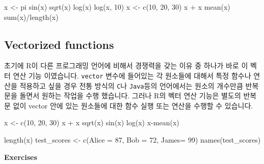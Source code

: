 \documentclass[
]{book}
\newenvironment{Shaded}{\begin{snugshade}}{\end{snugshade}}
\newcommand{\AttributeTok}[1]{\textcolor[rgb]{0.77,0.63,0.00}{#1}}
\newcommand{\DecValTok}[1]{\textcolor[rgb]{0.00,0.00,0.81}{#1}}
\newcommand{\FunctionTok}[1]{\textcolor[rgb]{0.00,0.00,0.00}{#1}}
\newcommand{\NormalTok}[1]{#1}
\newcommand{\OtherTok}[1]{\textcolor[rgb]{0.56,0.35,0.01}{#1}}
\newcommand{\SpecialCharTok}[1]{\textcolor[rgb]{0.00,0.00,0.00}{#1}}
\begin{document}
\begin{Shaded}
\begin{Highlighting}[]
\NormalTok{x }\OtherTok{\textless{}{-}}\NormalTok{ pi}
\FunctionTok{sin}\NormalTok{(x)}
\FunctionTok{sqrt}\NormalTok{(x)}
\FunctionTok{log}\NormalTok{(x)}
\FunctionTok{log}\NormalTok{(x, }\DecValTok{10}\NormalTok{)}
\NormalTok{x }\OtherTok{\textless{}{-}} \FunctionTok{c}\NormalTok{(}\DecValTok{10}\NormalTok{, }\DecValTok{20}\NormalTok{, }\DecValTok{30}\NormalTok{)}
\NormalTok{x }\SpecialCharTok{+}\NormalTok{ x}
\FunctionTok{mean}\NormalTok{(x)}
\FunctionTok{sum}\NormalTok{(x)}\SpecialCharTok{/}\FunctionTok{length}\NormalTok{(x)}
\end{Highlighting}
\end{Shaded}

\hypertarget{vectorized-functions}{%
\subsection{Vectorized functions}\label{vectorized-functions}}

초기에 R이 다른 프로그래밍 언어에 비해서 경쟁력을 갖는 이유 중 하나가 바로 이 벡터 연산 기능 이였습니다. \texttt{vector} 변수에 들어있는 각 원소들에 대해서 특정 함수나 연산을 적용하고 싶을 경우 전통 방식의 \texttt{C}나 \texttt{Java}등의 언어에서는 원소의 개수만큼 반복문을 돌면서 원하는 작업을 수행 했습니다. 그러나 R의 벡터 연산 기능은 별도의 반복문 없이 vector 안에 있는 원소들에 대한 함수 실행 또는 연산을 수행할 수 있습니다.

\begin{Shaded}
\begin{Highlighting}[]
\NormalTok{x }\OtherTok{\textless{}{-}} \FunctionTok{c}\NormalTok{(}\DecValTok{10}\NormalTok{, }\DecValTok{20}\NormalTok{, }\DecValTok{30}\NormalTok{)}
\NormalTok{x }\SpecialCharTok{+}\NormalTok{ x}
\FunctionTok{sqrt}\NormalTok{(x)}
\FunctionTok{sin}\NormalTok{(x)}
\FunctionTok{log}\NormalTok{(x)}
\NormalTok{x}\SpecialCharTok{{-}}\FunctionTok{mean}\NormalTok{(x)}

\FunctionTok{length}\NormalTok{(x)}
\NormalTok{test\_scores }\OtherTok{\textless{}{-}} \FunctionTok{c}\NormalTok{(}\AttributeTok{Alice =} \DecValTok{87}\NormalTok{, }\AttributeTok{Bob =} \DecValTok{72}\NormalTok{, }\AttributeTok{James=} \DecValTok{99}\NormalTok{)}
\FunctionTok{names}\NormalTok{(test\_scores)}
\end{Highlighting}
\end{Shaded}

\textbf{Exercises}
\end{document}
